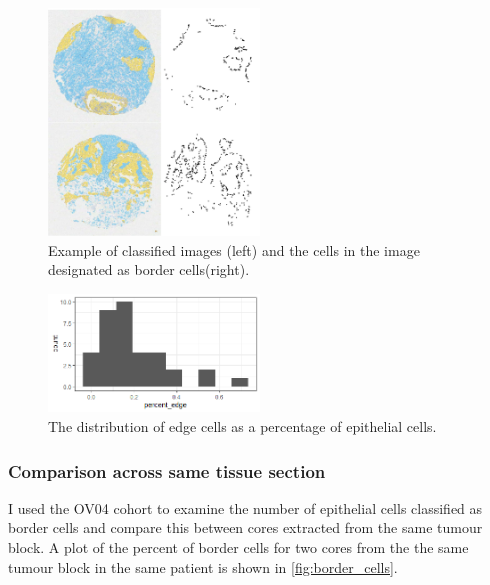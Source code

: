 \begin{figure}
    \centering
    \includegraphics[width=0.5\textwidth]{Chapter3/Figs/Thesis-08.png}
    \caption{Example of classified images (left) and the cells in the image designated as border cells(right).}
    \label{fig:edge_cells1}
\end{figure}

\begin{figure}
    \centering
    \includegraphics[width=0.5\textwidth]{Chapter4/figs/percent_edge.png}
    \caption{The distribution of edge cells as a percentage of epithelial cells.}
    \label{fig:edge_cells2}
\end{figure}


\subsubsection{Comparison across same tissue section}

I used the OV04 cohort to examine the number of epithelial cells classified as border cells and compare this between cores extracted from the same tumour block. A plot of the percent of border cells for two cores from the the same tumour block in the same patient is shown in \ref{fig:border_cells}.

